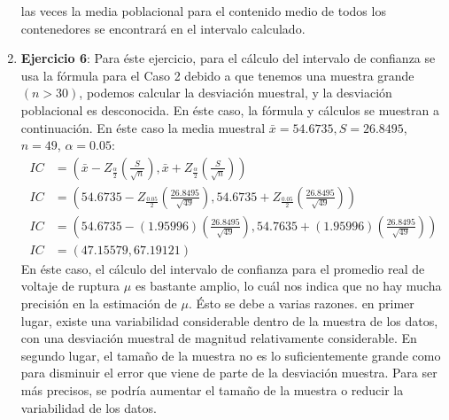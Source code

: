 \documentclass[12pt, letterpaper]{report}
\begin{document}
\begin{enumerate}
las veces la media poblacional para el contenido medio de todos los contenedores se encontrará en el intervalo 
calculado. 
\item \textbf{Ejercicio 6}: Para éste ejercicio, para el cálculo del intervalo de confianza se usa la fórmula para el 
Caso 2 debido a que tenemos una muestra grande $(n > 30)$, podemos calcular la desviación muestral, y la desviación poblacional es desconocida. 
En éste caso, la fórmula y cálculos se muestran a continuación. En éste caso la media muestral $\bar{x} = 54.6735, S = 26.8495$, $n = 49$, $\alpha = 0.05$: 
\begin{align*}
IC &= (\bar{x} - Z_{\frac{\alpha}{2}}(\frac{S}{\sqrt{n}}), \bar{x} + Z_{\frac{\alpha}{2}}(\frac{S}{\sqrt{n}}))\\ 
IC &= (54.6735 - Z_{\frac{0.05}{2}}(\frac{26.8495}{\sqrt{49}}), 54.6735 + Z_{\frac{0.05}{2}}(\frac{26.8495}{\sqrt{49}}))\\
IC &= (54.6735 - (1.95996)(\frac{26.8495}{\sqrt{49}}), 54.7635 + (1.95996)(\frac{26.8495}{\sqrt{49}}))\\ 
IC &= (47.15579, 67.19121)
\end{align*}
En éste caso, el cálculo del intervalo de confianza para el promedio real de voltaje de ruptura $\mu$ es bastante amplio, lo cuál 
nos indica que no hay mucha precisión en la estimación de $\mu$. Ésto se debe a varias razones. en primer lugar, existe una variabilidad considerable 
dentro de la muestra de los datos, con una desviación muestral de magnitud relativamente considerable. En segundo lugar, el tamaño de la muestra 
no es lo suficientemente grande como para disminuir el error que viene de parte de la desviación muestra. Para ser más precisos, se podría 
aumentar el tamaño de la muestra o reducir la variabilidad de los datos. 
\end{enumerate}
\end{document}

